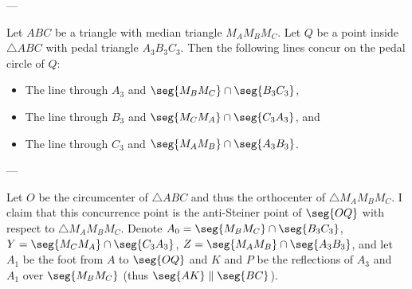 
---

Let $ABC$ be a triangle with median triangle $M_AM_BM_C$. Let $Q$ be a point inside $\triangle ABC$ with pedal triangle $A_3B_3C_3$. Then the following lines concur on the pedal circle of $Q$:
\begin{itemize}[itemsep=0em]
    \item The line through $A_3$ and $\seg{M_BM_C}\cap\seg{B_3C_3}$,
    \item The line through $B_3$ and $\seg{M_CM_A}\cap\seg{C_3A_3}$, and
    \item The line through $C_3$ and $\seg{M_AM_B}\cap\seg{A_3B_3}$.
\end{itemize}

---

Let $O$ be the circumcenter of $\triangle ABC$ and thus the orthocenter of $\triangle M_AM_BM_C$. I claim that this concurrence point is the anti-Steiner point of $\seg{OQ}$ with respect to $\triangle M_AM_BM_C$. Denote $A_0=\seg{M_BM_C}\cap\seg{B_3C_3}$, $Y=\seg{M_CM_A}\cap\seg{C_3A_3}$, $Z=\seg{M_AM_B}\cap\seg{A_3B_3}$, and let $A_1$ be the foot from $A$ to $\seg{OQ}$ and $K$ and $P$ be the reflections of $A_3$ and $A_1$ over $\seg{M_BM_C}$ (thus $\seg{AK}\parallel\seg{BC}$).


